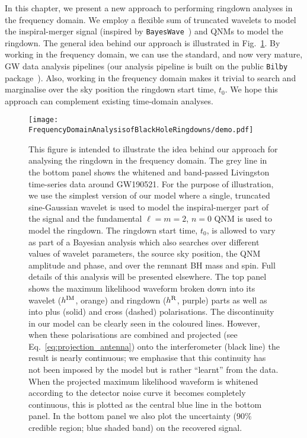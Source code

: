 In this chapter, we present a new approach to performing ringdown analyses in the frequency domain. 
We employ a flexible sum of truncated wavelets to model the inspiral-merger signal (inspired by \texttt{BayesWave}~\cite{Cornish:2014kda, Cornish:2020dwh}) and QNMs to model the ringdown.
The general idea behind our approach is illustrated in Fig.~\ref{fig:demo}.
By working in the frequency domain, we can use the standard, and now very mature, GW data analysis pipelines (our analysis pipeline is built on the public \texttt{Bilby} package~\cite{Ashton:2018jfp}).
Also, working in the frequency domain makes it trivial to search and marginalise over the sky position the ringdown start time, $t_0$. 
We hope this approach can complement existing time-domain analyses.

\begin{figure}[t!]
    \centering
    \texttt{[image: FrequencyDomainAnalysisofBlackHoleRingdowns/demo.pdf]}
    \caption[Illustration of the frequency-domain analysis method]{ 
    This figure is intended to illustrate the idea behind our approach for analysing the ringdown in the frequency domain.
    The grey line in the bottom panel shows the whitened and band-passed Livingston time-series data around GW190521. %
    For the purpose of illustration, we use the simplest version of our model where a single, truncated sine-Gaussian wavelet is used to model the inspiral-merger part of the signal and the fundamental $\ell=m=2$, $n=0$ QNM is used to model the ringdown.
    The ringdown start time, $t_0$, is allowed to vary as part of a Bayesian analysis which also searches over different values of wavelet parameters, the source sky position, the QNM amplitude and phase, and over the remnant BH mass and spin. 
    Full details of this analysis will be presented elsewhere.
    The top panel shows the maximum likelihood waveform broken down into its wavelet ($h^{\rm IM}$, orange) and ringdown ($h^{\rm R}$, purple) parts as well as into plus (solid) and cross (dashed) polarisations. 
    The discontinuity in our model can be clearly seen in the coloured lines. 
    However, when these polarisations are combined and projected (see Eq.~\ref{eq:projection_antenna}) onto the interferometer (black line) the result is nearly continuous; we emphasise that this continuity has not been imposed by the model but is rather ``learnt'' from the data. When the projected maximum likelihood waveform is whitened according to the detector noise curve it becomes completely continuous, this is plotted as the central blue line in the bottom panel.
    In the bottom panel we also plot the uncertainty (90\% credible region; blue shaded band) on the recovered signal.
    }
    \label{fig:demo}
\end{figure}

